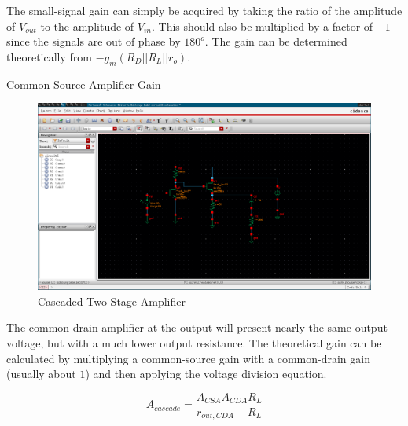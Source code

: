\FloatBarrier

The small-signal gain can simply be acquired by taking the ratio of the amplitude of $V_{out}$ to the amplitude of $V_{in}$. This should also be multiplied by a factor of $-1$ since the signals are out of phase by $180^{o}$.
The gain can be determined theoretically from $-g_{m} ( R_{D} || R_{L} || r_{o} )$.


\FloatBarrier

\begin{table}[h!]
	\centering
	\caption{Common-Source Amplifier Gain}
	\label{tab:common_source_amp_gain}
\end{table}

\FloatBarrier


\FloatBarrier

\begin{figure}[h!]
	\centering
	\includegraphics[scale=0.30]{./images/circuit6.PNG}
	\caption{Cascaded Two-Stage Amplifier}
	\label{fig:circuit6}
\end{figure}

\FloatBarrier

The common-drain amplifier at the output will present nearly the same output voltage, but with a much lower output resistance.
The theoretical gain can be calculated by multiplying a common-source gain with a common-drain gain (usually about $1$) and then applying the voltage division equation.

\begin{equation}
	\label{eq:theoretical_cascaded_gain}
	A_{cascade} = \frac{ A_{CSA} A_{CDA} R_{L} }{ r_{out,CDA} + R_{L} }
\end{equation}

